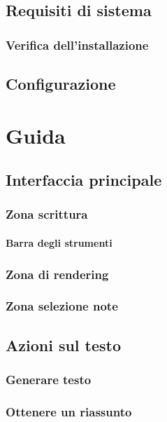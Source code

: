 \documentclass[a4paper, 10pt, colorlinks=true, linkcolor=black, urlcolor=blue, citecolor=blue, hidelinks]{article}
\begin{document}
\subsection{Requisiti di sistema}

\subsubsection{Verifica dell'installazione}

\subsection{Configurazione}

\section{Guida}

\subsection{Interfaccia principale}

\subsubsection{Zona scrittura}

\paragraph{Barra degli strumenti}

\subsubsection{Zona di rendering}

\subsubsection{Zona selezione note}

\subsection{Azioni sul testo}

\subsubsection{Generare testo}

\subsubsection{Ottenere un riassunto}
\end{document}
